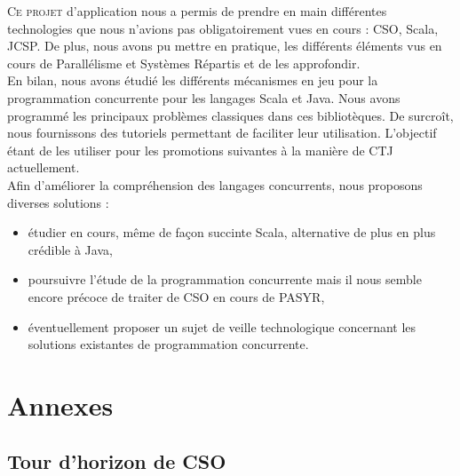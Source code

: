 \documentclass[a4paper,11pt,french]{report}
\begin{document}
\lettrine{C}{e projet} d'application nous a permis de prendre en main différentes technologies que nous n'avions pas obligatoirement vues en cours : CSO, Scala, JCSP. De plus, nous avons pu mettre en pratique, les différents éléments vus en cours de Parallélisme et Systèmes Répartis et de les approfondir.\\
En bilan, nous avons étudié les différents mécanismes en jeu pour la programmation concurrente pour les langages Scala et Java. Nous avons programmé les principaux problèmes classiques dans ces bibliotèques. De surcroît, nous fournissons des tutoriels permettant de faciliter leur utilisation. L'objectif étant de les utiliser pour les promotions suivantes à la manière de CTJ actuellement.\\

Afin d'améliorer la compréhension des langages concurrents, nous proposons diverses solutions :

\begin{itemize}
\item étudier en cours, même de façon succinte Scala, alternative de plus en plus crédible à Java,
\item poursuivre l'étude de la programmation concurrente mais il nous semble encore précoce de traiter de CSO en cours de PASYR,
\item éventuellement proposer un sujet de veille technologique concernant les solutions existantes de programmation concurrente.
\end{itemize}

\part{Annexes}
\appendix
\chapter{ Tour d'horizon de CSO }
\label{chap:cso}
\end{document}

